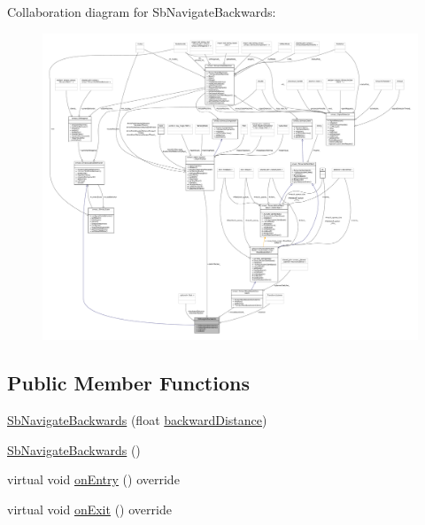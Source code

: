 Collaboration diagram for Sb\+Navigate\+Backwards\+:
\nopagebreak
\begin{figure}[H]
\begin{center}
\leavevmode
\includegraphics[width=350pt]{classSbNavigateBackwards__coll__graph}
\end{center}
\end{figure}
\subsection*{Public Member Functions}
\begin{DoxyCompactItemize}
\item 
\hyperlink{classSbNavigateBackwards_ae4e79eeac0dac325a4334445dfe1afc1}{Sb\+Navigate\+Backwards} (float \hyperlink{classSbNavigateBackwards_ad7e0e6b09dae085c1106335e208d6e84}{backward\+Distance})
\item 
\hyperlink{classSbNavigateBackwards_a2d0b3a241987236b79d0152ac208aa87}{Sb\+Navigate\+Backwards} ()
\item 
virtual void \hyperlink{classSbNavigateBackwards_a59b7bc4f0b714f548c73659c87dd405e}{on\+Entry} () override
\item 
virtual void \hyperlink{classSbNavigateBackwards_a351a904eb7cf10a90cc0d081795c40bd}{on\+Exit} () override
\end{DoxyCompactItemize}
